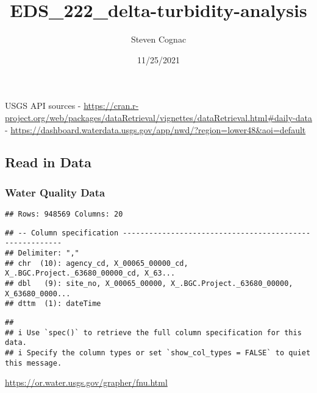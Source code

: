 \documentclass[
]{article}
\title{EDS\_222\_delta-turbidity-analysis}
\author{Steven Cognac}
\date{11/25/2021}
\begin{document}
\maketitle

USGS API sources -
\url{https://cran.r-project.org/web/packages/dataRetrieval/vignettes/dataRetrieval.html\#daily-data}
-
\url{https://dashboard.waterdata.usgs.gov/app/nwd/?region=lower48\&aoi=default}

\hypertarget{read-in-data}{%
\subsection{Read in Data}\label{read-in-data}}

\hypertarget{water-quality-data}{%
\subsubsection{Water Quality Data}\label{water-quality-data}}

\begin{verbatim}
## Rows: 948569 Columns: 20
\end{verbatim}

\begin{verbatim}
## -- Column specification --------------------------------------------------------
## Delimiter: ","
## chr  (10): agency_cd, X_00065_00000_cd, X_.BGC.Project._63680_00000_cd, X_63...
## dbl   (9): site_no, X_00065_00000, X_.BGC.Project._63680_00000, X_63680_0000...
## dttm  (1): dateTime
\end{verbatim}

\begin{verbatim}
## 
## i Use `spec()` to retrieve the full column specification for this data.
## i Specify the column types or set `show_col_types = FALSE` to quiet this message.
\end{verbatim}

\url{https://or.water.usgs.gov/grapher/fnu.html}
\end{document}
